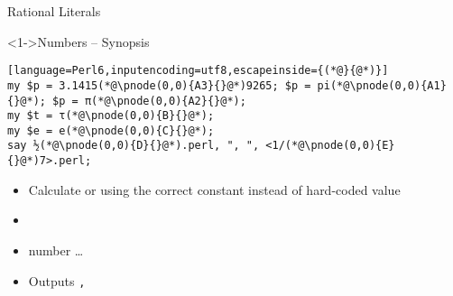\begin{frame}[fragile]{Rational Literals}
\begin{block}<1->{Numbers -- Synopsis}
\small
\begin{lstlisting}[language=Perl6,inputencoding=utf8,escapeinside={(*@}{@*)}]
my $p = 3.1415(*@\pnode(0,0){A3}{}@*)9265; $p = pi(*@\pnode(0,0){A1}{}@*); $p = π(*@\pnode(0,0){A2}{}@*);
my $t = τ(*@\pnode(0,0){B}{}@*);
my $e = e(*@\pnode(0,0){C}{}@*);
say ½(*@\pnode(0,0){D}{}@*).perl, ", ", <1/(*@\pnode(0,0){E}{}@*)7>.perl;
\end{lstlisting}

\end{block}

\begin{itemize}
\item<2-> Calculate  or  using the correct constant instead of hard-coded  value
\item<3-> 
\item<4->  number \ldots
\item<5-> Outputs \texttt{, }
\end{itemize}
\end{frame}

